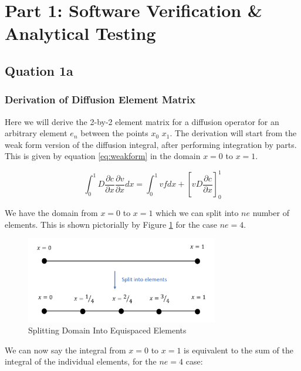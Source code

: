 \documentclass[11pt]{article}
\begin{document}


\clearpage
{}
\section{Part 1: Software Verification \& Analytical Testing}

\subsection{Quation 1a}
\subsubsection{Derivation of Diffusion Element Matrix}

Here we will derive the 2-by-2 element matrix for a diffusion operator for an arbitrary element $e_{n}$ between the points $x_{0}$ $x_{1}$. The derivation will start from the weak form version of the diffusion integral, after performing integration by parts. This is given by equation \ref{eq:weakform} in the domain $x = 0$ to $x = 1$.

\begin{equation} \label{eq:weakform}
\int_0^1 D \frac{\partial c}{\partial x}  \frac{\partial v}{\partial x}  dx = \int_0^1 vf dx + \left[vD\frac{\partial c}{\partial x} \right]_0^1
\end{equation}

We have the domain from $x = 0$ to $ x = 1$ which we can split into $ne$ number of elements. This is shown pictorially by Figure \ref{fig:domain2elements} for the case $ne = 4$.

\begin{figure}[h!]
\centering
\includegraphics[width=0.75\textwidth]{SplitIntoElements.PNG}
\caption{Splitting Domain Into Equispaced Elements}\label{fig:domain2elements}
\end{figure}

We can now say the integral from $x = 0$ to $x = 1$ is equivalent to the sum of the integral of the individual elements, for the $ne = 4$ case:
\end{document}
